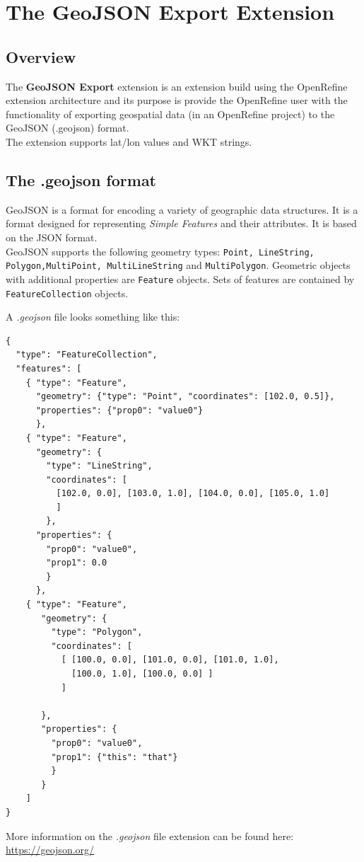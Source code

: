 \chapter{The GeoJSON Export Extension}\label{ch:the-geojson-export-extension}
\section{Overview}
The \textbf{GeoJSON Export} extension is an extension build using the OpenRefine extension architecture and its
purpose is provide the OpenRefine user with the functionality of exporting geospatial data (in an OpenRefine project) to
the GeoJSON (.geojson) format.\\
\newline
The extension supports lat/lon values and WKT strings.
\section{The .geojson format}
GeoJSON is a format for encoding a variety of geographic data structures.
It is a format designed for representing \textit{Simple Features} and their attributes.
It is based on the JSON format.\\
\newline
GeoJSON supports the following geometry types:
\texttt{Point, LineString, Polygon,MultiPoint, MultiLineString}
and \texttt{MultiPolygon}.
Geometric objects with additional properties are \texttt{Feature} objects.
Sets of features are contained by \texttt{FeatureCollection} objects. \cite{WhatIsGeoJSON}\\
\newline

A \textit{.geojson} file looks something like this:
\begin{verbatim}
{
  "type": "FeatureCollection",
  "features": [
    { "type": "Feature",
      "geometry": {"type": "Point", "coordinates": [102.0, 0.5]},
      "properties": {"prop0": "value0"}
      },
    { "type": "Feature",
      "geometry": {
        "type": "LineString",
        "coordinates": [
          [102.0, 0.0], [103.0, 1.0], [104.0, 0.0], [105.0, 1.0]
          ]
        },
      "properties": {
        "prop0": "value0",
        "prop1": 0.0
        }
      },
    { "type": "Feature",
       "geometry": {
         "type": "Polygon",
         "coordinates": [
           [ [100.0, 0.0], [101.0, 0.0], [101.0, 1.0],
             [100.0, 1.0], [100.0, 0.0] ]
           ]

       },
       "properties": {
         "prop0": "value0",
         "prop1": {"this": "that"}
         }
       }
    ]
}
\end{verbatim}
More information on the \textit{.geojson} file extension can be found here: \href{https://geojson.org/}{https://geojson.org/}
\pagebreak
